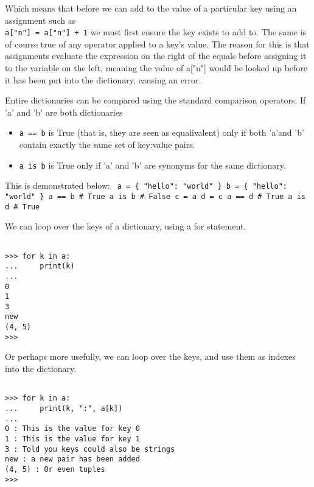 Which means that before we can add to the value of a particular key   using an assignment such as
\\
\texttt{a["n"] = a["n"] + 1} we   must first ensure the key exists to add to. The same is of course true   of any operator applied to a key's value. The reason for this is that   assignments evaluate the expression on the right of the equals before   assigning it to the variable on the left, meaning the value of a["n"]   would be looked up before it has been put into the dictionary, causing   an error.

Entire dictionaries can be compared using the standard comparison   operators. If 'a' and 'b' are both dictionaries
\begin{itemize}
	\item 
\texttt{a == b} is True (that is, they are seen as equalivalent) only if both    'a'and 'b' contain exactly the same set of key:value pairs.
	\item 
\texttt{a is b} is True only if 'a' and 'b' are synonyms    for the same dictionary.
\end{itemize}

This is demonstrated below:
\texttt{       a = \{ "hello": "world" \}       b = \{ "hello": "world" \}       a == b \# True       a is b \# False        c = a       d = c       a == d \# True       a is d \# True     }

We can loop over the keys of a dictionary, using a for   statement.
\begin{lstlisting}

>>> for k in a:
...     print(k)
... 
0
1
3
new
(4, 5)
>>>
\end{lstlisting}

Or perhaps more usefully, we can loop over the keys, and use them as   indexes into the dictionary.
\begin{lstlisting}

>>> for k in a:
...     print(k, ":", a[k])
... 
0 : This is the value for key 0
1 : This is the value for key 1
3 : Told you keys could also be strings
new : a new pair has been added
(4, 5) : Or even tuples
>>>
\end{lstlisting}

